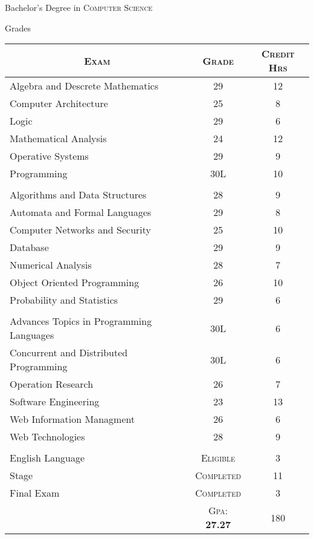 \documentclass[a4paper,10pt]{article}
\begin{document}
\newpage
\par{\centering\Large \hypertarget{grds}{Bachelor's Degree in \textsc{Computer Science}} \par}\large{\centering Grades\par}\normalsize
\begin{center}
\begin{tabular}{lcc}
\multicolumn{1}{c}{\textsc{Exam}}&\textsc{Grade}&\textsc{Credit Hrs}\\ \hline
Algebra and Descrete Mathematics	&29& 12 \\
Computer Architecture	&25&	8\\
Logic	&29&	6\\
Mathematical Analysis	&24& 12\\
Operative Systems	&29&	9\\
Programming	&30L &	10\\ \\

Algorithms and Data Structures	&28 &	9\\
Automata and Formal Languages	& 29 &	8\\
Computer Networks and Security	&25	&10\\
Database	&29&	9\\
Numerical Analysis	&28&	7\\
Object Oriented Programming	& 26 &	10\\
Probability and Statistics	&29&	6\\ \\

Advances Topics in Programming Languages & 30L & 6 \\
Concurrent and Distributed Programming	& 30L &	6\\
Operation Research	&26&	7\\ 
Software Engineering & 23 &	13\\
Web Information Managment & 26 & 6 \\
Web Technologies & 28 & 9 \\ \\
English Language	& \textsc{Eligible} &	3\\
Stage	& \textsc{Completed}	& 11 \\
Final Exam	& \textsc{Completed}	& 3 \\	
		\cline{2-3}
	&\textsc{Gpa: } \textbf{27.27} & 180 \\
\end{tabular}
\end{center}
\end{document}
